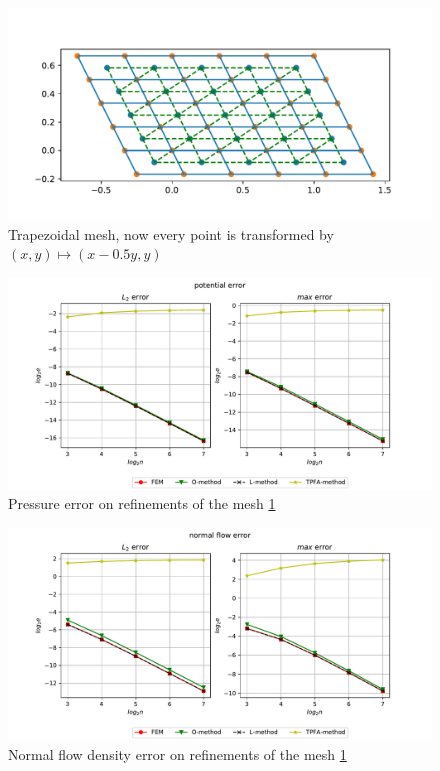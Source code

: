 \documentclass[../Main/main.tex]{subfiles}
\begin{document}
		\begin{figure}[H]
			\centering
			\includegraphics[width=1\textwidth]{mesh_trapezoidal.pdf}
			\caption{Trapezoidal mesh, now every point is transformed by $(x,y)  \mapsto (x-0.5y,y)$}
			\label{fig:mesh_trapezoidal}
		\end{figure}
	
	\begin{figure}[H]
		\advance\leftskip-1cm
		\includegraphics[width=1.2\textwidth]{pressure_trapezoidal_1d1.pdf}
		\caption{Pressure error on refinements of the mesh \ref{fig:mesh_trapezoidal}}
		\label{fig:mesh_trapezoidal_potential}
	\end{figure}
	\begin{figure}[H]
		\advance\leftskip-1cm
		\includegraphics[width=1.2\textwidth]{flow_trapezoidal_1d1.pdf}
		\caption{Normal flow density error on refinements of the mesh \ref{fig:mesh_trapezoidal}}
		\label{fig:mesh_trapezoidal_flow}
	\end{figure}
	
\end{document}
